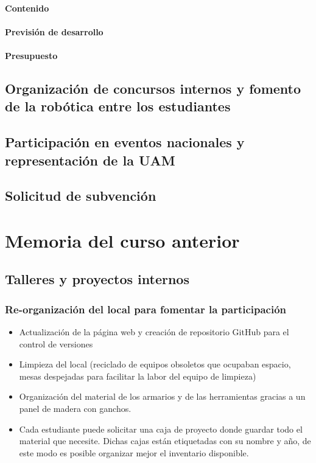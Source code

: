 \documentclass[12pt,twoside]{report}
\begin{document}
\subsubsection{Contenido}
\subsubsection{Previsión de desarrollo}
\subsubsection{Presupuesto}


\section{Organización de concursos internos y fomento de la robótica entre los estudiantes}


\section{Participación en eventos nacionales y representación de la UAM}

\section{Solicitud de subvención}




\chapter{Memoria del curso anterior}

\section{Talleres y proyectos internos}

\subsection{Re-organización del local para fomentar la participación}

\begin{itemize}
\item Actualización de la página web y creación de repositorio GitHub para el control de versiones
\item Limpieza del local (reciclado de equipos obsoletos que ocupaban espacio, mesas despejadas para facilitar la labor del equipo de limpieza)
\item Organización del material de los armarios y de las herramientas gracias a un panel de madera con ganchos.
\item Cada estudiante puede solicitar una caja de proyecto donde guardar todo el material que necesite. Dichas cajas están etiquetadas con su nombre y año, de este modo es posible organizar mejor el inventario disponible.
\end{itemize}
\end{document}

